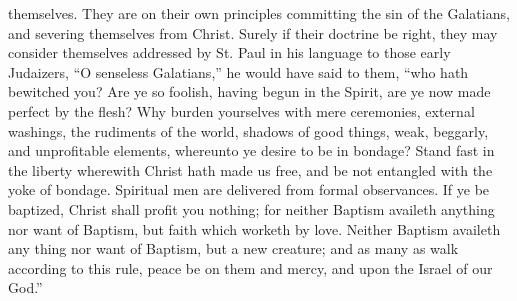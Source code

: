 themselves. They are on their own principles committing the sin of the
Galatians, and severing themselves from Christ. Surely if their
doctrine be right, they may consider themselves addressed by St. Paul
in his language to those early Judaizers, ``O senseless
Galatians,'' he would have said to them, ``who hath bewitched
you? Are ye so foolish, having begun in the Spirit, are ye now made
perfect by the flesh? Why burden yourselves with mere ceremonies,
external washings, the rudiments of the world, shadows of good things,
weak, beggarly, and unprofitable elements, whereunto ye desire to be
in bondage? Stand fast in the liberty wherewith Christ hath made us
free, and be not entangled with the yoke of bondage. Spiritual men are
delivered from formal observances. If ye be baptized, Christ shall
profit you nothing; for neither Baptism availeth anything nor want of
Baptism, but faith which worketh by love. Neither Baptism availeth any
thing nor want of Baptism, but a new creature; and as many as walk
according to this rule, peace be on them and mercy, and upon the
Israel of our God.''

